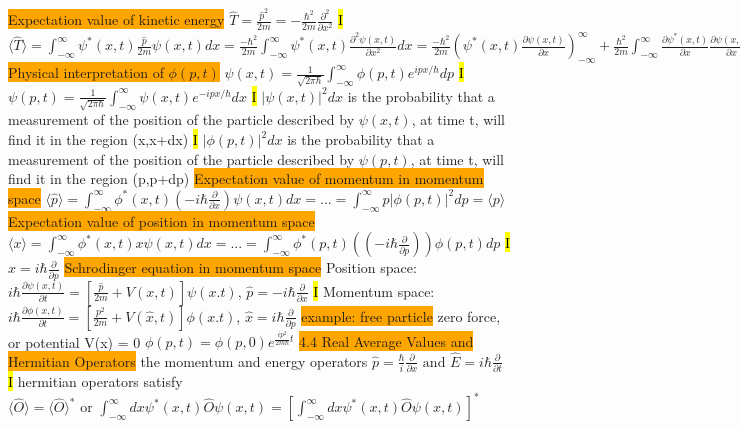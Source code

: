 \documentclass[fontsize=4pt]{scrartcl}
\begin{document}
\colorbox{Orange}{Expectation value of kinetic energy}
$\hat{T} = \frac{\hat{p}^2}{2m} = -\frac{\hbar^2}{2m}\frac{\partial^2}{\partial x^2}$
\hl{I}
$\langle \hat{T} \rangle = \int_{-\infty}^{\infty} \psi^* (x,t)\frac{\hat{p}}{2m}\psi(x,t)dx = \frac{-\hbar^2}{2m} \int_{-\infty}^{\infty} \psi^* (x,t) \frac{\partial^2 \psi(x,t)}{\partial x^2}dx = \frac{-\hbar^2}{2m}(\psi^*(x,t)\frac{\partial \psi(x,t)}{\partial x})_{-\infty}^{\infty} + \frac{\hbar^2}{2m} \int_{-\infty}^{\infty}\frac{\partial \psi^*(x,t)}{\partial x}\frac{\partial \psi (x,t)}{\partial x}dx =\frac{\hbar^2}{2m} \int_{-\infty}^{\infty} |\frac{\partial \psi (x,t)}{\partial x}|^2 dx$
\colorbox{Orange}{Physical interpretation of $\phi(p,t)$}
$\psi(x,t) = \frac{1}{\sqrt{2\pi \hbar}} \int_{-\infty}^{\infty} \phi(p,t)e^{ipx/\hbar} dp$ 
\hl{I}
$\psi(p,t) = \frac{1}{\sqrt{2\pi \hbar}} \int_{-\infty}^{\infty} \psi(x,t)e^{-ipx/\hbar} dx$ 
\hl{I}
$| \psi(x,t)|^2 dx $ is the probability that a measurement of the position of the particle described by $\psi(x,t)$, at time t, will find it in the region (x,x+dx)
\hl{I}
$| \phi(p,t)|^2 dx $ is the probability that a measurement of the position of the particle described by $\psi(p,t)$, at time t, will find it in the region (p,p+dp)
\colorbox{Orange}{Expectation value of momentum in momentum space}
$\langle \hat{p} \rangle = \int_{-\infty}^{\infty} \phi^* (x,t)(-i\hbar \frac{\partial}{\partial x})\psi(x,t) dx = ... =  \int_{-\infty}^{\infty} p |\phi(p,t)|^2 dp = \langle p \rangle$
\colorbox{Orange}{Expectation value of position in momentum space}
$\langle x \rangle = \int_{-\infty}^{\infty} \phi^* (x,t) x \psi(x,t) dx = ... =  \int_{-\infty}^{\infty} \phi^*(p,t) ((-i\hbar \frac{\partial}{\partial p})) \phi(p,t) dp$
\hl{I}
$\hat{x} = i\hbar \frac{\partial}{\partial p}$
\colorbox{Orange}{Schrodinger equation in momentum space}
Position space:
$i\hbar \frac{\partial \psi (x,t)}{\partial t} = [\frac{\hat{p}}{2m}+V(x,t)]\psi(x.t)$, $\hat{p} = -i\hbar \frac{\partial}{\partial x}$
\hl{I}
Momentum space: 
$i\hbar \frac{\partial \phi (x,t)}{\partial t} = [\frac{p^2}{2m}+V(\hat{x},t)]\phi(x.t)$, $\hat{x} = i\hbar \frac{\partial}{\partial p}$
\colorbox{Orange}{example: free particle}
zero force, or potential V(x) = 0
$\phi(p,t) = \phi(p,0) e^{\frac{ip^2}{2m\hbar}t}$
\colorbox{Orange}{4.4 Real Average Values and Hermitian Operators}
the momentum and energy operators $\hat{p} = \frac{\hbar}{i}\frac{\partial}{\partial x} \text{ and } \hat{E} = i\hbar \frac{\partial}{\partial t}$
\hl{I}
hermitian operators satisfy $\langle \hat{O} \rangle = \langle \hat{O}\rangle^{*}  \text{ or } \int_{-\infty}^{\infty} dx \psi^* (x,t) \hat{O} \psi (x,t) = [\int_{-\infty}^{\infty} dx \psi^* (x,t) \hat{O} \psi (x,t)]^* $
\end{document}
